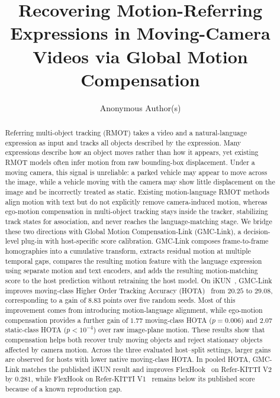 \documentclass[sigconf,anonymous,nonacm]{acmart}
\begin{document}
\title{Recovering Motion-Referring Expressions in Moving-Camera Videos via Global Motion Compensation}

\author{Anonymous Author(s)}

\begin{abstract}
  Referring multi-object tracking (RMOT) takes a video and a natural-language expression as input and tracks all objects described by the expression. Many expressions describe how an object moves rather than how it appears, yet existing RMOT models often infer motion from raw bounding-box displacement. Under a moving camera, this signal is unreliable: a parked vehicle may appear to move across the image, while a vehicle moving with the camera may show little displacement on the image and be incorrectly treated as static. Existing motion-language RMOT methods align motion with text but do not explicitly remove camera-induced motion, whereas ego-motion compensation in multi-object tracking stays inside the tracker, stabilizing track states for association, and never reaches the language-matching stage. We bridge these two directions with Global Motion Compensation-Link (GMC-Link), a decision-level plug-in with host-specific score calibration. GMC-Link composes frame-to-frame homographies into a cumulative transform, extracts residual motion at multiple temporal gaps, compares the resulting motion feature with the language expression using separate motion and text encoders, and adds the resulting motion-matching score to the host prediction without retraining the host model. On iKUN~\cite{ikun}, GMC-Link improves moving-class Higher Order Tracking Accuracy (HOTA)~\cite{hota} from $20.25$ to $29.08$, corresponding to a gain of $8.83$ points over five random seeds. Most of this improvement comes from introducing motion-language alignment, while ego-motion compensation provides a further gain of $1.77$ moving-class HOTA ($p{=}0.006$) and $2.07$ static-class HOTA ($p{<}10^{-4}$) over raw image-plane motion. These results show that compensation helps both recover truly moving objects and reject stationary objects affected by camera motion. Across the three evaluated host--split settings, larger gains are observed for hosts with lower native moving-class HOTA. In pooled HOTA, GMC-Link matches the published iKUN result and improves FlexHook~\cite{flexhook} on Refer-KITTI V2~\cite{temprmot} by $0.281$, while FlexHook on Refer-KITTI V1~\cite{transrmot} remains below its published score because of a known reproduction gap.
\end{abstract}
\end{document}
